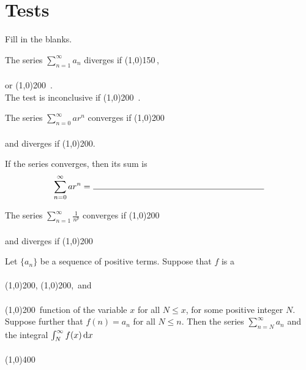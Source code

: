 \documentclass[12pt]{amsart}
\begin{document}
\newpage

\section{Tests}

Fill in the blanks.

\begin{thm}
  The series \(\sum_{n = 1}^\infty a_n\) diverges if \line(1,0){150}\,,\\
  \vspace{0.10in}\\
  or \line(1,0){200}\ .
  \vspace{0.10in}\\
  The test is inconclusive if \line(1,0){200}\ .
\end{thm}

\begin{thm}
  The series \(\sum_{n = 0}^\infty a r^n\) converges if \line(1,0){200}\\
  \vspace{0.10in}\\
  and diverges if \line(1,0){200}.
  
  \noindent If the series converges, then its sum is\\
  \[\sum_{n = 0}^\infty a r^n =\ \line(1,0){200}\]
\end{thm}

\begin{thm}
  The series \(\sum_{n = 1}^\infty \frac{1}{n^p}\) converges if \line(1,0){200}\\
  \vspace{.10in}\\
  and diverges if \line(1,0){200}
\end{thm}

\begin{thm}
  Let \(\{a_n\}\) be a sequence of positive terms.
  Suppose that \(f\) is a\\
  \vspace{.10in}\\
  \line(1,0){200},
  \line(1,0){200},\, and\\
  \vspace{.10in}\\
  \line(1,0){200}\ function of the variable \(x\) for all \(N \leq x\), for some positive integer \(N\).
  Suppose further that \(f(n) = a_n\) for all \(N \leq n\).
  Then the series \(\sum_{n = N}^\infty a_n\) and the integral \(\int_N^\infty f(x)\dif x\)\\
  \vspace{.10in}\\
  \line(1,0){400}
\end{thm}
\end{document}
